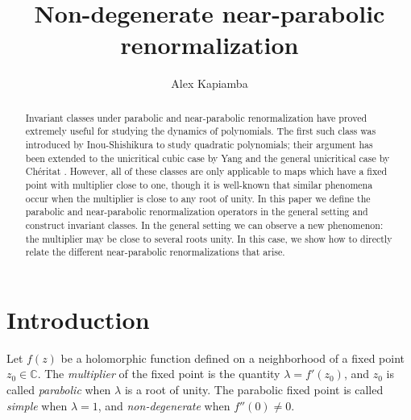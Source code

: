 \documentclass[12pt,letterpaper]{amsart}
\title{Non-degenerate near-parabolic renormalization}
\author{Alex Kapiamba}
\date{}
\numberwithin{equation}{section}
\theoremstyle{remark}
\theoremstyle{definition}
\begin{document}
	\begin{abstract}
		Invariant classes under parabolic and near-parabolic renormalization have proved extremely useful for studying the dynamics of polynomials. The first such class was introduced by Inou-Shishikura \cite{shishikura} to study quadratic polynomials; their argument has been extended to the unicritical cubic case by Yang \cite{Yang} and the general unicritical case by Ch\'eritat \cite{Cheritat22}. However, all of these classes are only applicable to maps which have a fixed point with multiplier close to one, though it is well-known that similar phenomena occur when the multiplier is close to any root of unity. In this paper we define the parabolic and near-parabolic renormalization operators in the general setting and construct invariant classes.
		In the general setting we can observe a new phenomenon: the multiplier may be close to several roots unity. In this case, we show how to directly relate the different near-parabolic renormalizations that arise.
	\end{abstract}
	
	\maketitle
	
	
	
	\section*{Introduction}
	
	Let $f(z)$ be a holomorphic function defined on a neighborhood of a fixed point $z_0\in \mathbb{C}$.
	The \textit{multiplier} of the fixed point is the quantity $\lambda=f'(z_0)$, and $z_0$ is called \textit{parabolic} when $\lambda$ is a root of unity. 
	The parabolic fixed point is called \textit{simple} when $\lambda =1$, and \textit{non-degenerate} when $f''(0)\neq 0$.
	
\end{document}
